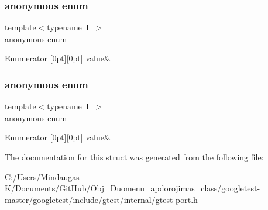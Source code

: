 \subsubsection{\texorpdfstring{anonymous enum}{anonymous enum}}
{\footnotesize\ttfamily template$<$typename T $>$ \\
anonymous enum}

\begin{DoxyEnumFields}{Enumerator}
[0pt][0pt]{}\mbox{\label{structtesting_1_1internal_1_1_is_same_3_01_t_00_01_t_01_4_a7542ab96b5dce9fd030e8582cd722a2ba54c7af2031ab78f1d6b0930425b5c5a9}} 
value&\\
\hline

\end{DoxyEnumFields}
\mbox{\label{structtesting_1_1internal_1_1_is_same_3_01_t_00_01_t_01_4_ac0d986abcf98ce8eb16fbb9da6d1e6c4}} 
\subsubsection{\texorpdfstring{anonymous enum}{anonymous enum}}
{\footnotesize\ttfamily template$<$typename T $>$ \\
anonymous enum}

\begin{DoxyEnumFields}{Enumerator}
[0pt][0pt]{}\mbox{\label{structtesting_1_1internal_1_1_is_same_3_01_t_00_01_t_01_4_a7542ab96b5dce9fd030e8582cd722a2ba54c7af2031ab78f1d6b0930425b5c5a9}} 
value&\\
\hline

\end{DoxyEnumFields}


The documentation for this struct was generated from the following file\+:\begin{DoxyCompactItemize}
\item 
C\+:/\+Users/\+Mindaugas K/\+Documents/\+Git\+Hub/\+Obj\+\_\+\+Duomenu\+\_\+apdorojimas\+\_\+class/googletest-\/master/googletest/include/gtest/internal/\mbox{\hyperlink{googletest-master_2googletest_2include_2gtest_2internal_2gtest-port_8h}{gtest-\/port.\+h}}\end{DoxyCompactItemize}
